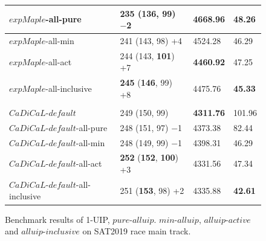\documentclass[runningheads]{llncs}
\newcommand{\oneuip}{1-UIP\xspace}
\newcommand{\allUipPure}{\textit{pure-alluip}\xspace}
\newcommand{\allUipMin}{\textit{min-alluip}\xspace}
\newcommand{\allUipAct}{\textit{alluip-active}}
\newcommand{\allUipIn}{\textit{alluip-inclusive}}
\newcommand{\expSATShort}{\textit{expMaple} }
\newcommand{\defaultcadical}{\textit{CaDiCaL-default}}
\begin{document}
\begin{figure}
\begin{center}
\begin{tabular}{|l|l|l|l|}
\hline
$\expSATShort$-all-pure & 235 (136, 99) $-$2  & 4668.96 & 48.26 \\
\hline
$\expSATShort$-all-min & 241 (143, 98) +4 & 4524.28 & 46.29 \\ 
\hline
$\expSATShort$-all-act & 244 (143, \textbf{101}) +7 & \textbf{4460.92} & 47.25 \\
\hline
$\expSATShort$-all-inclusive & \textbf{245} (\textbf{146}, 99) +8 & 4475.76 & \textbf{45.33}
\\
\hline
\hline
 & & &\\
$\defaultcadical$ & 249 (150, 99)  & \textbf{4311.76} & 101.96 \\
\hline
$\defaultcadical$-all-pure & 248 (151, 97) $-$1  & 4373.38 & 82.44  \\
\hline
$\defaultcadical$-all-min & 248 (149, 99) $-$1 & 4398.31 & 46.29 \\ 
\hline
$\defaultcadical$-all-act & \textbf{252} (\textbf{152}, \textbf{100}) +3 & 4331.56 & 47.34 \\
\hline
$\defaultcadical$-all-inclusive & 251 (\textbf{153}, 98) +2 & 4335.88 & \textbf{42.61}
\\
\hline
\end{tabular}
\end{center}
\caption{Benchmark results of \oneuip, $\allUipPure$. $\allUipMin$, $\allUipAct$ and $\allUipIn$ on SAT2019 race main track.}
\label{fig:t5}
\end{figure}
\end{document}

